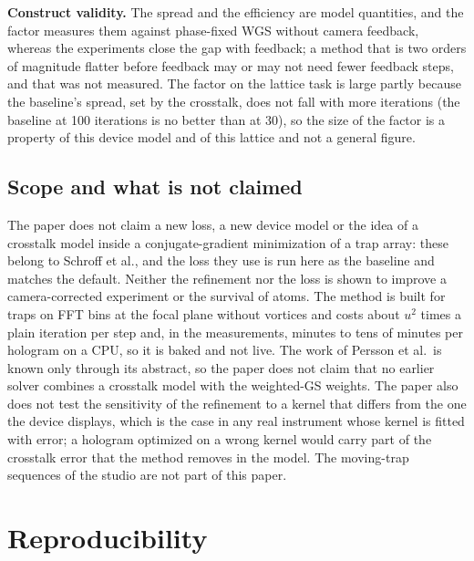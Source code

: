 \textbf{Construct validity.} The spread and the efficiency are model quantities, and the factor measures them against phase-fixed WGS without camera feedback, whereas the experiments close the gap with feedback; a method that is two orders of magnitude flatter before feedback may or may not need fewer feedback steps, and that was not measured. The factor on the lattice task is large partly because the baseline's spread, set by the crosstalk, does not fall with more iterations (the baseline at 100 iterations is no better than at 30), so the size of the factor is a property of this device model and of this lattice and not a general figure.

\subsection{Scope and what is not claimed}

The paper does not claim a new loss, a new device model or the idea of a crosstalk model inside a conjugate-gradient minimization of a trap array: these belong to Schroff et al., and the loss they use is run here as the baseline and matches the default. Neither the refinement nor the loss is shown to improve a camera-corrected experiment or the survival of atoms. The method is built for traps on FFT bins at the focal plane without vortices and costs about $u^2$ times a plain iteration per step and, in the measurements, minutes to tens of minutes per hologram on a CPU, so it is baked and not live. The work of Persson et al.\ is known only through its abstract, so the paper does not claim that no earlier solver combines a crosstalk model with the weighted-GS weights. The paper also does not test the sensitivity of the refinement to a kernel that differs from the one the device displays, which is the case in any real instrument whose kernel is fitted with error; a hologram optimized on a wrong kernel would carry part of the crosstalk error that the method removes in the model. The moving-trap sequences of the studio are not part of this paper.

\section{Reproducibility}\label{sec:repro}

